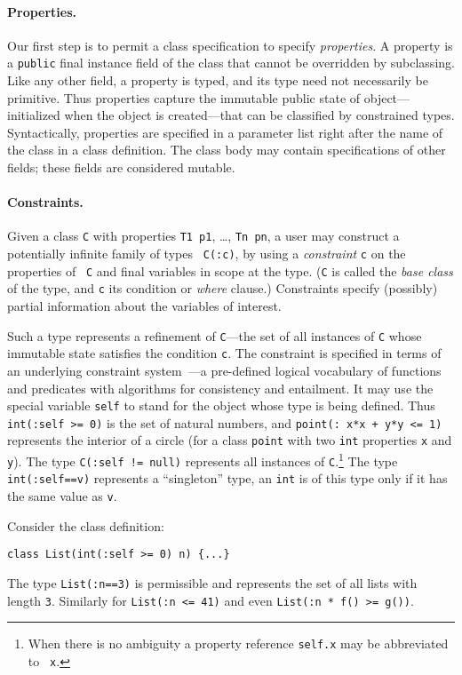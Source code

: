 \paragraph{Properties.}
Our first step is to permit a class specification to specify {\em
properties}. A property is a {\tt public} final instance field of the
class that cannot be overridden by subclassing. Like any other field,
a property is typed, and its type need not necessarily be
primitive. Thus properties capture the immutable public state of
object---initialized when the object is created---that can be
classified by constrained types. Syntactically, properties are
specified in a parameter list right after the name of the class in a
class definition. The class body may contain specifications of other
fields; these fields are considered mutable.

\paragraph{Constraints.}
Given a class {\tt C} with properties {\tt T1 p1}, \ldots, {\tt Tn
pn}, a user may construct a potentially infinite family of types {\tt
C(:c)}, by using a {\em constraint} {\tt c} on the properties of {\tt
C} and final variables in scope at the type. ({\tt C} is called the
{\em base class} of the type, and {\tt c} its condition or {\em where}
clause.)  Constraints specify (possibly) partial information about the
variables of interest. 

Such a type represents a refinement of {\tt C}---the set of all
instances of {\tt C} whose immutable state satisfies the condition
{\tt c}.  The constraint is specified in terms of an underlying
constraint system~\cite{CCCC}---a pre-defined logical vocabulary of
functions and predicates with algorithms for consistency and
entailment.  It may use the special variable {\tt self} to stand for
the object whose type is being defined. Thus {\tt int(:self >= 0)} is
the set of natural numbers, and {\tt point(: x*x + y*y <= 1)}
represents the interior of a circle (for a class {\tt point} with two
{\tt int} properties {\tt x} and {\tt y}). The type {\tt C(:self !=
null)} represents all instances of {\tt C}.\footnote{When there is no
ambiguity a property reference {\tt self.x} may be abbreviated to {\tt
x}.} The type {\tt int(:self==v)} represents a ``singleton'' type, an
{\tt int} is of this type only if it has the same value as {\tt v}.

\begin{example}	
Consider the class definition:
{\footnotesize
\begin{verbatim}
class List(int(:self >= 0) n) {...}
\end{verbatim}}
The type {\tt List(:n==3)} is permissible and represents the set of
all lists with length {\tt 3}. Similarly for {\tt List(:n <= 41)}
and even {\tt List(:n * f() >= g())}.
\end{example}

